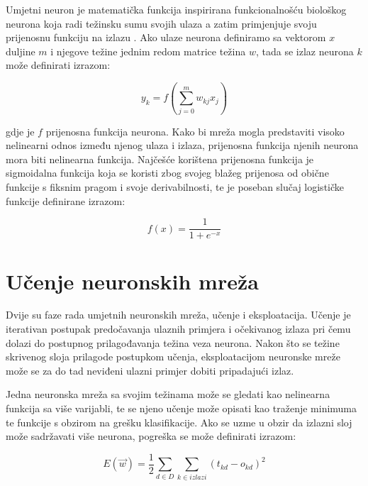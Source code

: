 \documentclass[lmodern, utf8, diplomski, numeric]{fer}
\begin{document}
Umjetni neuron je matematička funkcija inspirirana funkcionalnošću biološkog neurona koja radi težinsku sumu svojih ulaza a zatim primjenjuje svoju prijenosnu funkciju na izlazu \cite{neuron1943pitts}. Ako ulaze neurona definiramo sa vektorom $x$ duljine $m$ i njegove težine jednim redom matrice težina $w$, tada se izlaz neurona $k$ može definirati izrazom:

\begin{equation}
y_k = f \left (\sum\limits_{j=0}^m w_{kj} x_j \right )          
\end{equation}

\hspace{2em}

gdje je $f$ prijenosna funkcija neurona. Kako bi mreža mogla predstaviti visoko nelinearni odnos između njenog ulaza i izlaza, prijenosna funkcija njenih neurona mora biti nelinearna funkcija. Najčešće korištena prijenosna funkcija je sigmoidalna funkcija koja se koristi zbog svojeg blažeg prijenosa od obične funkcije s fiksnim pragom i svoje derivabilnosti, te je poseban slučaj logističke funkcije definirane izrazom:

\begin{equation}
f(x) = \frac{1}{1 + e^{-x}}
\end{equation}

\hspace{2em}

\section{Učenje neuronskih mreža}

Dvije su faze rada umjetnih neuronskih mreža, učenje i eksploatacija. Učenje je iterativan postupak predočavanja ulaznih primjera i očekivanog izlaza pri čemu dolazi do postupnog prilagođavanja težina veza neurona. Nakon što se težine skrivenog sloja prilagode postupkom učenja, eksploatacijom neuronske mreže može se za do tad neviđeni ulazni primjer dobiti pripadajući izlaz.

Jedna neuronska mreža sa svojim težinama može se gledati kao nelinearna funkcija sa više varijabli, te se njeno učenje može opisati kao traženje minimuma te funkcije s obzirom na grešku klasifikacije. Ako se uzme u obzir da izlazni sloj može sadržavati više neurona, pogreška se može definirati izrazom:

\begin{equation}
E(\vec{w}) = \frac{1}{2} \sum\limits_{d \in D} \sum\limits_{k \in izlazi} (t_{kd} - o_{kd})^2
\end{equation}
\end{document}
